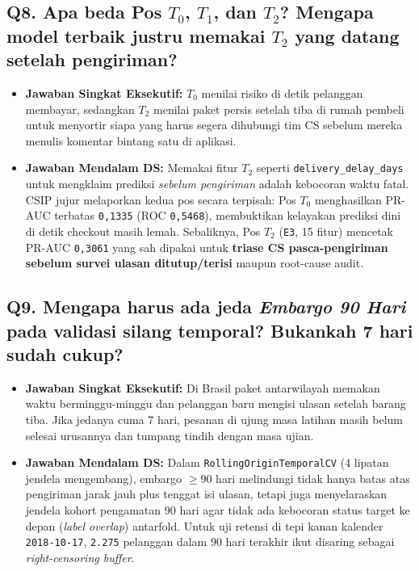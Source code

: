 \documentclass[11pt,a4paper,oneside]{book}
\newcommand{\code}[1]{{\small\nolinkurl{#1}}}
\begin{document}
\subsection*{Q8. Apa beda Pos $T_0$, $T_1$, dan $T_2$? Mengapa model terbaik justru memakai $T_2$ yang datang setelah pengiriman?}
\begin{itemize}
  \item \textbf{Jawaban Singkat Eksekutif:} $T_0$ menilai risiko di detik pelanggan membayar, sedangkan $T_2$ menilai paket persis setelah tiba di rumah pembeli untuk menyortir siapa yang harus segera dihubungi tim CS sebelum mereka menulis komentar bintang satu di aplikasi.
  \item \textbf{Jawaban Mendalam DS:} Memakai fitur $T_2$ seperti \code{delivery_delay_days} untuk mengklaim prediksi \emph{sebelum pengiriman} adalah kebocoran waktu fatal. CSIP jujur melaporkan kedua pos secara terpisah: Pos $T_0$ menghasilkan PR-AUC terbatas \code{0,1335} (ROC \code{0,5468}), membuktikan kelayakan prediksi dini di detik checkout masih lemah. Sebaliknya, Pos $T_2$ (\code{E3}, 15 fitur) mencetak PR-AUC \code{0,3061} yang sah dipakai untuk \textbf{triase CS pasca-pengiriman sebelum survei ulasan ditutup/terisi} maupun root-cause audit.
\end{itemize}

\subsection*{Q9. Mengapa harus ada jeda \emph{Embargo 90 Hari} pada validasi silang temporal? Bukankah 7 hari sudah cukup?}
\begin{itemize}
  \item \textbf{Jawaban Singkat Eksekutif:} Di Brasil paket antarwilayah memakan waktu berminggu-minggu dan pelanggan baru mengisi ulasan setelah barang tiba. Jika jedanya cuma 7 hari, pesanan di ujung masa latihan masih belum selesai urusannya dan tumpang tindih dengan masa ujian.
  \item \textbf{Jawaban Mendalam DS:} Dalam \code{RollingOriginTemporalCV} (4 lipatan jendela mengembang), embargo $\ge 90$ hari melindungi tidak hanya batas atas pengiriman jarak jauh plus tenggat isi ulasan, tetapi juga menyelaraskan jendela kohort pengamatan 90 hari agar tidak ada kebocoran status target ke depan (\emph{label overlap}) antarfold. Untuk uji retensi di tepi kanan kalender \code{2018-10-17}, \code{2.275} pelanggan dalam 90 hari terakhir ikut disaring sebagai \emph{right-censoring buffer}.
\end{itemize}
\end{document}
